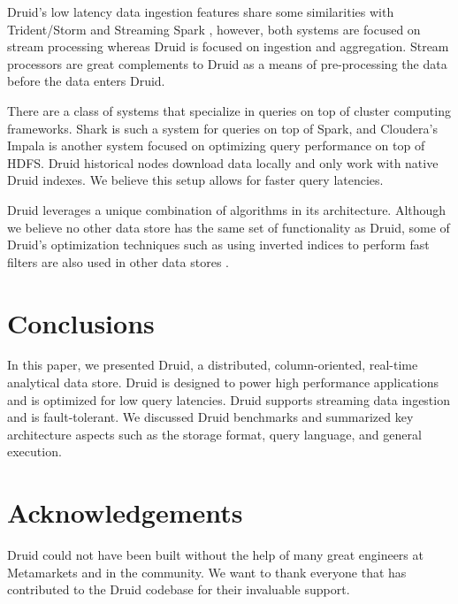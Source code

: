 \documentclass{sig-alternate-2013}
\begin{document}
Druid's low latency data ingestion features share some similarities with
Trident/Storm \cite{marz2013storm} and Streaming Spark
\cite{zaharia2012discretized}, however, both systems are focused on stream
processing whereas Druid is focused on ingestion and aggregation. Stream
processors are great complements to Druid as a means of pre-processing the data
before the data enters Druid.

There are a class of systems that specialize in queries on top of cluster
computing frameworks.  Shark \cite{engle2012shark} is such a system for queries
on top of Spark, and Cloudera's Impala \cite{cloudera2013} is another system
focused on optimizing query performance on top of HDFS. Druid historical nodes
download data locally and only work with native Druid indexes. We believe this
setup allows for faster query latencies.

Druid leverages a unique combination of algorithms in its
architecture. Although we believe no other data store has the same set
of functionality as Druid, some of Druid’s optimization techniques such as using
inverted indices to perform fast filters are also used in other data
stores \cite{macnicol2004sybase}.

\section{Conclusions}
\label{sec:conclusions}
In this paper, we presented Druid, a distributed, column-oriented, real-time
analytical data store. Druid is designed to power high performance applications
and is optimized for low query latencies. Druid supports streaming data
ingestion and is fault-tolerant. We discussed Druid benchmarks and
summarized key architecture aspects such
as the storage format, query language, and general execution.

\balance

\section{Acknowledgements}
\label{sec:acknowledgements}
Druid could not have been built without the help of many great engineers at
Metamarkets and in the community.  We want to thank everyone that has
contributed to the Druid codebase for their invaluable support. 




\end{document}
